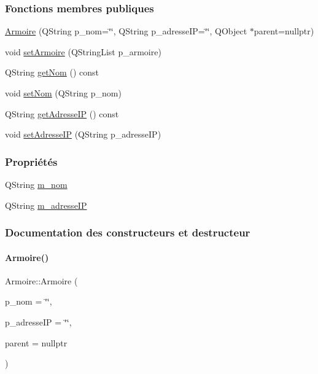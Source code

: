 \subsubsection*{Fonctions membres publiques}
\begin{DoxyCompactItemize}
\item 
\hyperlink{class_armoire_a07fe0cc415ac18d95a338b73412fead9}{Armoire} (Q\+String p\+\_\+nom=\char`\"{}\char`\"{}, Q\+String p\+\_\+adresse\+IP=\char`\"{}\char`\"{}, Q\+Object $\ast$parent=nullptr)
\item 
void \hyperlink{class_armoire_a4b35e93cee5c78739ba543162e4dbfaa}{set\+Armoire} (Q\+String\+List p\+\_\+armoire)
\item 
Q\+String \hyperlink{class_armoire_a0045e45e0c9a465af765667344ce8bee}{get\+Nom} () const
\item 
void \hyperlink{class_armoire_ab05030741c5930bb73a8fef5b378ed37}{set\+Nom} (Q\+String p\+\_\+nom)
\item 
Q\+String \hyperlink{class_armoire_a5196fec5f44f63216ddce5fbc512c919}{get\+Adresse\+IP} () const
\item 
void \hyperlink{class_armoire_a0be45a8a0574139b955cc1f1b51a40d6}{set\+Adresse\+IP} (Q\+String p\+\_\+adresse\+IP)
\end{DoxyCompactItemize}
\subsubsection*{Propriétés}
\begin{DoxyCompactItemize}
\item 
Q\+String \hyperlink{class_armoire_a6d5fc6a37737b4822dc89191a79f6b7b}{m\+\_\+nom}
\item 
Q\+String \hyperlink{class_armoire_ae92e8c48f53e69b871e7f70d9af19ffa}{m\+\_\+adresse\+IP}
\end{DoxyCompactItemize}


\subsubsection{Documentation des constructeurs et destructeur}
\mbox{\label{class_armoire_a07fe0cc415ac18d95a338b73412fead9}} 
\paragraph{\texorpdfstring{Armoire()}{Armoire()}}
{\footnotesize\ttfamily Armoire\+::\+Armoire (\begin{DoxyParamCaption}\item[{Q\+String}]{p\+\_\+nom = {\ttfamily \char`\"{}\char`\"{}},  }\item[{Q\+String}]{p\+\_\+adresse\+IP = {\ttfamily \char`\"{}\char`\"{}},  }\item[{Q\+Object $\ast$}]{parent = {\ttfamily nullptr} }\end{DoxyParamCaption})\hspace{0.3cm}{\ttfamily [explicit]}}


